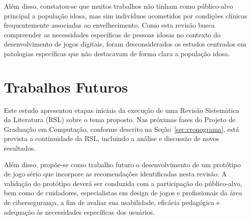 Além disso, constatou-se que muitos trabalhos não tinham como público-alvo principal a população idosa, mas sim indivíduos acometidos por condições clínicas frequentemente associadas ao envelhecimento. Como esta revisão busca compreender as necessidades específicas de pessoas idosas no contexto do desenvolvimento de jogos digitais, foram desconsiderados os estudos centrados em patologias específicas que não destacavam de forma clara a população idosa.

\section{Trabalhos Futuros}

Este estudo apresentou etapas iniciais da execução de uma Revisão Sistemática da Literatura (RSL) sobre o tema proposto. Nas próximas fases do Projeto de Graduação em Computação, conforme descrito na Seção~\ref{sec:cronograma}, está prevista a continuidade da RSL, incluindo a análise e discussão de novos resultados.

Além disso, propõe-se como trabalho futuro o desenvolvimento de um protótipo de jogo sério que incorpore as recomendações identificadas nesta revisão. A validação do protótipo deverá ser conduzida com a participação do público-alvo, bem como de cuidadores, especialistas em design de jogos e profissionais da área de cibersegurança, a fim de avaliar sua usabilidade, eficácia pedagógica e adequação às necessidades específicas dos usuários.
